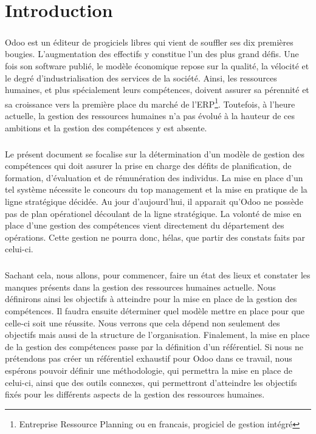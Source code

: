 \chapter*{Introduction}
\paragraph{}
Odoo est un éditeur de progiciels libres qui vient de souffler ses dix premières bougies. L'augmentation des effectifs y constitue l'un des plus grand défis. Une fois son software publié, le modèle économique repose sur la qualité, la vélocité et le degré d’industrialisation des services de la société. Ainsi, les ressources humaines, et plus spécialement leurs compétences, doivent assurer sa pérennité et sa croissance vers la première place du marché de l'ERP\footnote{Entreprise Ressource Planning ou en francais, progiciel de gestion intégré}. Toutefois, à l'heure actuelle, la gestion des ressources humaines n'a pas évolué à la hauteur de ces ambitions et la gestion des compétences y est absente. 

\paragraph{}Le présent document se focalise sur la détermination d'un modèle de gestion des compétences qui doit assurer la prise en charge des défits de planification, de formation, d'évaluation et de rémunération des individus. La mise en place d'un tel système nécessite le concours du top management et la mise en pratique de la ligne stratégique décidée. Au jour d'aujourd'hui, il apparait qu'Odoo ne possède pas de plan opérationel découlant de la ligne stratégique. La volonté de mise en place d'une gestion des compétences vient directement du département des opérations. Cette gestion ne pourra donc, hélas, que partir des constats faits par celui-ci. 

\paragraph{}Sachant cela, nous allons, pour commencer, faire un état des lieux et constater les manques présents dans la gestion des ressources humaines actuelle. Nous définirons ainsi les objectifs à atteindre pour la mise en place de la gestion des compétences. Il faudra ensuite déterminer quel modèle mettre en place pour que celle-ci soit une réussite. Nous verrons que cela dépend non seulement des objectifs mais aussi de la structure de l'organisation. Finalement, la mise en place de la gestion des compétences passe par la définition d'un référentiel. Si nous ne prétendons pas créer un référentiel exhaustif pour Odoo dans ce travail, nous espérons pouvoir définir une méthodologie, qui permettra la mise en place de celui-ci, ainsi que des outils connexes, qui permettront d'atteindre les objectifs fixés pour les différents aspects de la gestion des ressources humaines. 
